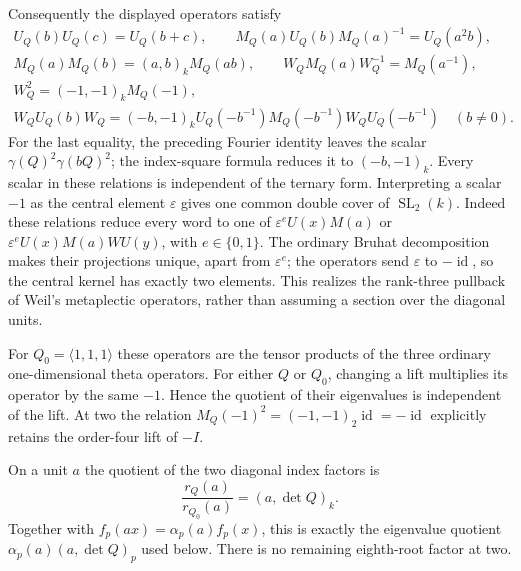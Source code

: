 Consequently the displayed operators satisfy
\[
 \begin{gathered}
 U_Q(b)U_Q(c)=U_Q(b+c),\qquad
 M_Q(a)U_Q(b)M_Q(a)^{-1}=U_Q(a^2b),\\
 M_Q(a)M_Q(b)=(a,b)_kM_Q(ab),\qquad
 W_QM_Q(a)W_Q^{-1}=M_Q(a^{-1}),\\
 W_Q^2=(-1,-1)_kM_Q(-1),\\
 W_QU_Q(b)W_Q
 =(-b,-1)_kU_Q(-b^{-1})M_Q(-b^{-1})W_QU_Q(-b^{-1})
 \quad(b\ne0).
 \end{gathered}
\]
For the last equality, the preceding Fourier identity leaves
the scalar $\gamma(Q)^2\gamma(bQ)^2$; the index-square formula
reduces it to $(-b,-1)_k$. Every scalar in these relations is
independent of the ternary form. Interpreting a scalar $-1$ as
the central element $\varepsilon$ gives one common double
cover of $\operatorname{SL}_2(k)$. Indeed these relations reduce
every word to one of
$\varepsilon^eU(x)M(a)$ or
$\varepsilon^eU(x)M(a)WU(y)$, with $e\in\{0,1\}$.
The ordinary Bruhat decomposition makes their projections
unique, apart from $\varepsilon^e$; the operators send
$\varepsilon$ to $-\operatorname{id}$, so the central kernel
has exactly two elements. This realizes the rank-three pullback
of Weil's metaplectic operators, rather than assuming a section
over the diagonal units.

For $Q_0=\langle1,1,1\rangle$ these operators are the tensor
products of the three ordinary one-dimensional theta operators.
For either $Q$ or $Q_0$, changing a lift multiplies its operator
by the same $-1$. Hence the quotient of their eigenvalues is
independent of the lift. At two the relation
$M_Q(-1)^2=(-1,-1)_2\operatorname{id}=-\operatorname{id}$
explicitly retains the order-four lift of $-I$.

On a unit $a$ the quotient of the two diagonal index factors is
\[
 \frac{r_Q(a)}{r_{Q_0}(a)}=(a,\det Q)_k.
\]
Together with $f_p(ax)=\alpha_p(a)f_p(x)$, this is exactly
the eigenvalue quotient $\alpha_p(a)(a,\det Q)_p$ used below.
There is no remaining eighth-root factor at two.

